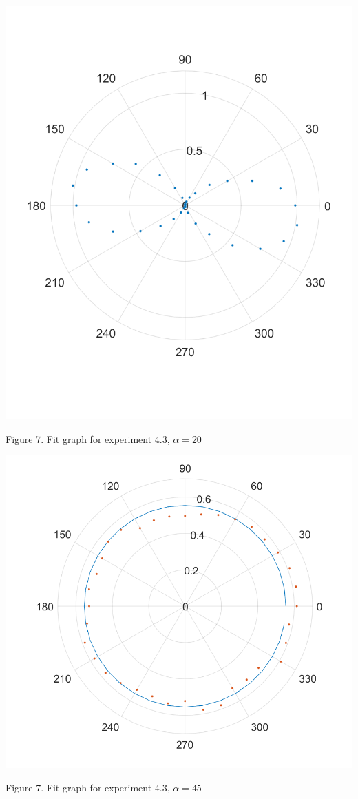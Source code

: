 \documentclass[12pt, a4paper]{article}
\begin{document}
\centerline{\includegraphics[scale = 0.4]{fig4.png}}
\centerline{Figure 7. Fit graph for experiment 4.3, $\alpha = 20$}

\centerline{\includegraphics[scale = 0.4]{fig5.png}}
\centerline{Figure 7. Fit graph for experiment 4.3, $\alpha = 45$}
\end{document}
